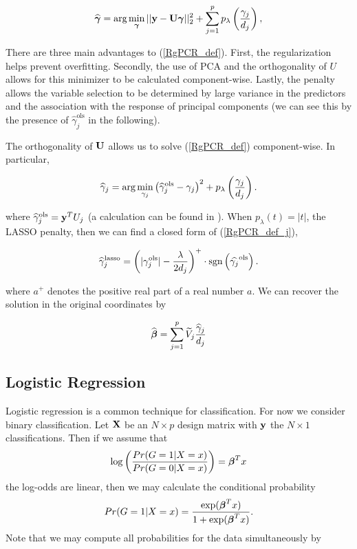 \documentclass[main.tex]{subfiles}
\begin{document}
\begin{align}
    \widehat{\boldsymbol \gamma} = \text{arg} \min_{\boldsymbol \gamma} ||\mathbf{y} - \mathbf{U} \boldsymbol \gamma||^2_2 + \sum_{j = 1}^p p_\lambda \left ( \frac{\gamma_j}{d_j} \right ), \label{RgPCR_def}
\end{align}

There are three main advantages to (\ref{RgPCR_def}). First, the regularization helps prevent overfitting. Secondly, the use of PCA and the orthogonality of $U$ allows for this minimizer to be calculated component-wise. Lastly, the penalty allows the variable selection to be determined by large variance in the predictors and the association with the response of principal components (we can see this by the presence of $\hat{\gamma}^{\text{ols}}_j$ in the following). 

The orthogonality of $\mathbf{U}$ allows us to solve (\ref{RgPCR_def}) component-wise. In particular,

\begin{align}
    \widehat{\gamma}_j = \text{arg} \min_{\gamma_j}  \left ( \widehat{\gamma}^{\text{ols}}_j - \gamma_j \right )^2 + p_\lambda \left ( \frac{\gamma_j}{d_j} \right ).  \label{RgPCR_def_j}
\end{align}

where $\widehat{\gamma}^{\text{ols}}_j = \mathbf{y}^T U_j$ (a calculation can be found in \cite{langzou}). When $p_{\lambda}(t) = |t|$, the LASSO penalty, then we can find a closed form of (\ref{RgPCR_def_j}),

\begin{align}
	\widehat{\gamma}_j^{\text{lasso}} = \left ( |\gamma_j^{\text{ols}}| - \frac{\lambda}{2d_j} \right )^+ \cdot \text{sgn} \left ( \widehat{\gamma_j}^{\text{ols}} \right ).
\end{align}

where $a^+$ denotes the positive real part of a real number $a$. We can recover the solution in the original coordinates by

\begin{align}
	\widehat{\boldsymbol \beta} = \sum_{j = 1}^p \widetilde{V}_j \frac{\widehat{\gamma}_j}{d_j}
\end{align}

\subsection{Logistic Regression}
Logistic regression is a common technique for classification. For now we consider binary classification. Let $\mathbf{X}$ be an $N \times p$ design matrix with $\mathbf{y}$ the $N \times 1$ classifications. Then if we assume that
\begin{align}
    \log \left ( \dfrac{Pr(G = 1 | X = x)}{Pr(G = 0|X = x)}\right ) = \boldsymbol \beta^Tx \label{log-odds}
\end{align}
the log-odds are linear, then we may calculate the conditional probability
\begin{align}
    Pr(G = 1 | X = x) = \dfrac{\text{exp}(\boldsymbol \beta^Tx)}{1 + \text{exp}(\boldsymbol \beta^Tx)}.
\end{align}
Note that we may compute all probabilities for the data simultaneously by
\end{document}
